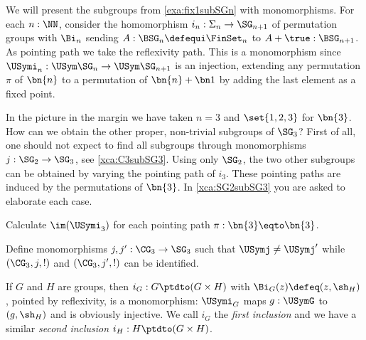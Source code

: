 \begin{example}
  \label{ex:SGninSGn+1}
We will present the subgroups from \cref{exa:fix1subSGn} with
monomorphisms. For each $n:\NN$, consider the  homomorphism 
$i_n:\Sigma_n\to\SG_{n+1}$ of permutation groups
with $\Bi_n$ sending $A:\BSG_n\defequi \FinSet_n$ to $A+\true:\BSG_{n+1}$.
As pointing path we take the reflexivity path.
This is a monomorphism since $\USymi_n:\USym\SG_n\to\USym\SG_{n+1}$ 
is an injection, extending any permutation $\pi$ of $\bn{n}$ to 
a permutation of $\bn{n}+\bn1$ by adding the last element as a
fixed point.

In the picture in the margin we have taken $n=3$ and
$\set{1,2,3}$ for $\bn{3}$. How can we obtain the other proper,
non-trivial subgroups of $\SG_3$? First of all, one should not
expect to find all subgroups through monomorphisms $j:\SG_2\to\SG_3$,
see \cref{xca:C3subSG3}. Using only $\SG_2$, the
two other subgroups can be obtained by varying the pointing
path of $i_3$. These pointing paths are induced by the permutations 
of $\bn{3}$. In \cref{xca:SG2subSG3} you are asked to elaborate each case.
\end{example}

\begin{xca}\label{xca:SG2subSG3}
Calculate $\im(\USymi_3)$ for each pointing path $\pi:\bn{3}\eqto\bn{3}$.
\end{xca}

\begin{xca}\label{xca:C3subSG3}
Define monomorphisms $j,j':\CG_3\to\SG_3$ such that $\USymj\neq \USymj'$
while $(\CG_3,j,!)$ and $(\CG_3,j',!)$ can be identified.
\end{xca}

\begin{example}
  \label{ex:prodinclismono}
  If $G$ and $H$ are groups, then $i_G : G \ptdto (G\times H)$ with
  $\Bi_G(z) \defeq (z,\sh_H)$, pointed by reflexivity, is a monomorphism:
  $\USymi_G$ maps $g:\USymG$ to $(g,\sh_H)$ and is obviously injective.
  We call $i_G$ the \emph{first inclusion} and we have a similar
  \emph{second inclusion} $i_H : H \ptdto (G\times H)$.
  \end{example}


